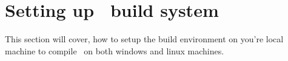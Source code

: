 \section{Setting up \CNAME\ build system\label{sec:build_environment}}
This section will cover, how to setup the build environment on you're local machine to compile \CNAME\, on both windows and linux machines.
